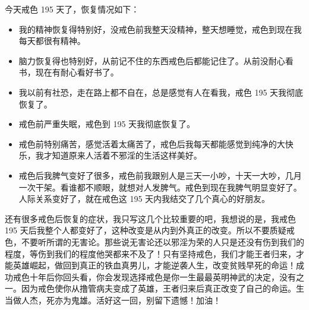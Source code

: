 \begin{case}
    今天戒色 195 天了，恢复情况如下：\begin{itemize}
        \item 我的精神恢复得特别好，没戒色前我整天没精神，整天想睡觉，戒色到现在我每天都很有精神。
        \item 脑力恢复得也特别好，从前记不住的东西戒色后都能记住了。从前没耐心看书，现在有耐心看好书了。
        \item 我以前有社恐，走在路上都不自在，总是感觉有人在看我，戒色 195 天我彻底恢复了。
        \item 戒色前严重失眠，戒色到 195 天我彻底恢复了。
        \item 戒色前特别痛苦，感觉活着太痛苦了，戒色后我每天都能感觉到纯净的大快乐，我才知道原来人活着不邪淫的生活这样美好。
        \item 戒色后我脾气变好了很多，戒色前我跟别人是三天一小吵，十天一大吵，几月一次干架。看谁都不顺眼，就想对人发脾气。戒色到现在我脾气明显变好了。人际关系变好了，就在戒色这 195 天内我结交了几个真心的好朋友。
    \end{itemize} 还有很多戒色后恢复的症状，我只写这几个比较重要的吧，我想说的是，我戒色 195 天后我整个人都变好了，这种改变是从内到外真正的改变。所以不要质疑戒色，不要听所谓的无害论。那些说无害论还以邪淫为荣的人只是还没有伤到我们的程度，等伤到我们的程度他哭都来不及了！只有坚持戒色，我们才能王者归来，才能英雄崛起，做回到真正的铁血真男儿，才能逆袭人生，改变贫贱早死的命运！成功戒色十年后你回头看，你会发现选择戒色是你一生最最英明神武的决定，没有之一。因为戒色使你从撸管病夫变成了英雄，王者归来后真正改变了自己的命运。生当做人杰，死亦为鬼雄。活好这一回，别留下遗憾！加油！


\end{case}

